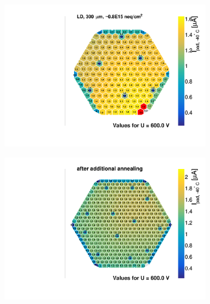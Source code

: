 \begin{figure}
\begin{subfigure}[b]{0.32\textwidth}
		\subcaption{
		}
		\label{plot:iv_hexplot_0541_04}
	\end{subfigure}
	\hfill	
	\begin{subfigure}[b]{0.32\textwidth}
		\includegraphics[width=0.999\textwidth]{plots/iv_hexplots/1013.pdf}
		\subcaption{
		}
		\label{plot:iv_hexplot_1013}
	\end{subfigure}
    \hfill
	\begin{subfigure}[b]{0.32\textwidth}
		\includegraphics[width=0.999\textwidth]{plots/iv_hexplots/3009_annealed.pdf}
		\subcaption{
		}
		\label{plot:iv_hexplot_3009_annealed}
	\end{subfigure}
	\hfill
	\begin{subfigure}[b]{0.32\textwidth}

\end{subfigure}
\end{figure}
